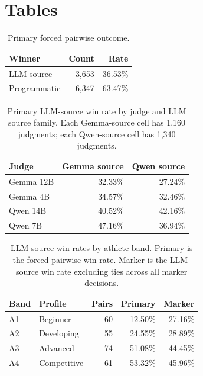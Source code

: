 \documentclass[11pt]{article}
\begin{document}
\clearpage
\onecolumn
\section*{Tables}
\begin{table}[H]
\centering
\small
\begin{tabular}{lrr}
\toprule
Winner & Count & Rate \\
\midrule
LLM-source & 3,653 & 36.53\% \\
Programmatic & 6,347 & 63.47\% \\
\bottomrule
\end{tabular}
\caption{Primary forced pairwise outcome.}
\label{tab:primary}
\end{table}

\begin{table}[H]
\centering
\small
\begin{tabular}{lrr}
\toprule
Judge & Gemma source & Qwen source \\
\midrule
Gemma 12B & 32.33\% & 27.24\% \\
Gemma 4B & 34.57\% & 32.46\% \\
Qwen 14B & 40.52\% & 42.16\% \\
Qwen 7B & 47.16\% & 36.94\% \\
\bottomrule
\end{tabular}
\caption{Primary LLM-source win rate by judge and LLM source family. Each Gemma-source cell has 1,160 judgments; each Qwen-source cell has 1,340 judgments.}
\label{tab:judge-source}
\end{table}

\begin{table}[H]
\centering
\small
\setlength{\tabcolsep}{3.5pt}
\begin{tabular}{llrrr}
\toprule
Band & Profile & Pairs & Primary & Marker \\
\midrule
A1 & Beginner & 60 & 12.50\% & 27.16\% \\
A2 & Developing & 55 & 24.55\% & 28.89\% \\
A3 & Advanced & 74 & 51.08\% & 44.45\% \\
A4 & Competitive & 61 & 53.32\% & 45.96\% \\
\bottomrule
\end{tabular}
\caption{LLM-source win rates by athlete band. Primary is the forced pairwise win rate. Marker is the LLM-source win rate excluding ties across all marker decisions.}
\label{tab:athlete}
\end{table}
\end{document}
